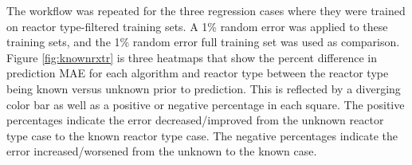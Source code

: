
The workflow was repeated for the three regression cases where they were
trained on reactor type-filtered training sets. A 1\% random error was applied
to these training sets, and the 1\% random error full training set was used as
comparison.  Figure \ref{fig:knownrxtr} is three heatmaps that show the percent
difference in prediction \gls{MAE} for each algorithm and reactor type between
the reactor type being known versus unknown prior to prediction. This is
reflected by a diverging color bar as well as a positive or negative percentage
in each square.  The positive percentages indicate the error decreased/improved
from the unknown reactor type case to the known reactor type case.  The
negative percentages indicate the error increased/worsened from the unknown to
the known case. 

